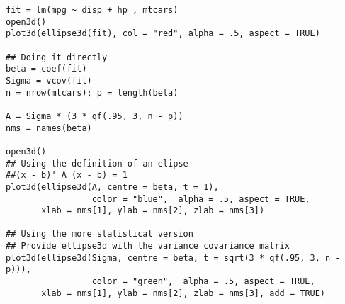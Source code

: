 \begin{verbatim}
fit = lm(mpg ~ disp + hp , mtcars)
open3d()
plot3d(ellipse3d(fit), col = "red", alpha = .5, aspect = TRUE)

## Doing it directly
beta = coef(fit)
Sigma = vcov(fit)
n = nrow(mtcars); p = length(beta)

A = Sigma * (3 * qf(.95, 3, n - p))
nms = names(beta)

open3d()
## Using the definition of an elipse
##(x - b)' A (x - b) = 1
plot3d(ellipse3d(A, centre = beta, t = 1), 
                 color = "blue",  alpha = .5, aspect = TRUE, 
       xlab = nms[1], ylab = nms[2], zlab = nms[3]) 

## Using the more statistical version
## Provide ellipse3d with the variance covariance matrix
plot3d(ellipse3d(Sigma, centre = beta, t = sqrt(3 * qf(.95, 3, n - p))), 
                 color = "green",  alpha = .5, aspect = TRUE, 
       xlab = nms[1], ylab = nms[2], zlab = nms[3], add = TRUE) 

\end{verbatim}












